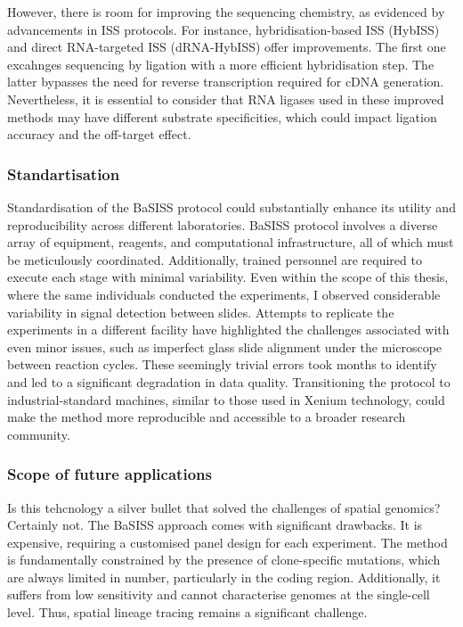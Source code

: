 However, there is room for improving the sequencing chemistry, as evidenced by advancements in \ac{ISS} protocols. For instance, hybridisation-based \ac{ISS} (HybISS) \parencite{Gyllborg2020-uq} and direct RNA-targeted \ac{ISS} (dRNA-HybISS) \parencite{Lee2022-ha} offer improvements. The first one excahnges sequencing by ligation with a more efficient hybridisation step. The latter bypasses the need for reverse transcription required for cDNA generation. Nevertheless, it is essential to consider that RNA ligases used in these improved methods may have different substrate specificities, which could impact ligation accuracy and the off-target effect.

\subsubsection*{Standartisation}

Standardisation of the \ac{BaSISS} protocol could substantially enhance its utility and reproducibility across different laboratories. \ac{BaSISS} protocol involves a diverse array of equipment, reagents, and computational infrastructure, all of which must be meticulously coordinated. Additionally, trained personnel are required to execute each stage with minimal variability. Even within the scope of this thesis, where the same individuals conducted the experiments, I observed considerable variability in signal detection between slides. Attempts to replicate the experiments in a different facility have highlighted the challenges associated with even minor issues, such as imperfect glass slide alignment under the microscope between reaction cycles. These seemingly trivial errors took months to identify and led to a significant degradation in data quality. Transitioning the protocol to industrial-standard machines, similar to those used in Xenium technology, could make the method more reproducible and accessible to a broader research community.

\subsubsection*{Scope of future applications}

Is this tehcnology a silver bullet that solved the challenges of spatial genomics? Certainly not. The \ac{BaSISS} approach comes with significant drawbacks. It is expensive, requiring a customised panel design for each experiment. The method is fundamentally constrained by the presence of clone-specific mutations, which are always limited in number, particularly in the coding region. Additionally, it suffers from low sensitivity and cannot characterise genomes at the single-cell level. Thus, spatial lineage tracing remains a significant challenge.

